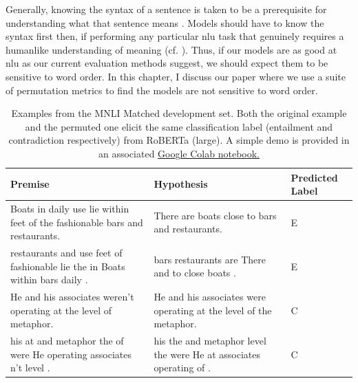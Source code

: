 \documentclass[letterpaper, 12pt]{report}
\begin{document}
Generally, knowing the syntax of a sentence is taken to be a prerequisite for understanding what that sentence means \citep{heim-kratzer-1998-semantics}.
Models should have to know the syntax first then, if performing any particular \acrshort{nlu} task that genuinely requires a humanlike understanding of meaning (cf. \citealt{bender-koller-2020-climbing}).
Thus, if our models are as good at \acrshort{nlu} as our current evaluation methods suggest, we should expect them to be sensitive to word order.
In this chapter, I discuss our paper \cite{sinha-etal-2021-unnatural} where we use a suite of permutation metrics to find the models are not sensitive to word order.

\begin{table}[t]
    \centering
    \small
    \begin{adjustbox}{max width=0.95\linewidth}
    \begin{tabular}{p{11em}p{9em}p{3em}} %
    \toprule
     \bf Premise & \bf Hypothesis & \bf Predicted Label \\ \midrule
    Boats in daily use lie within feet of the fashionable bars and restaurants.  & There are boats close to bars and restaurants. & E \\
    \addlinespace[0.5em]
    restaurants and use feet of fashionable lie the in Boats within bars daily . & bars restaurants are There and to close boats . & E \\ \midrule
    He and his associates weren't operating at the level of metaphor. & He and his associates were operating at the level of the metaphor. & C\\  \addlinespace[0.5em]
    his at and metaphor the of were He operating associates n't level . & his the and metaphor level the were He at associates operating of . & C\\
    \bottomrule
    \end{tabular}
   \end{adjustbox}
    \caption{Examples from the MNLI Matched development set. Both the original example and the permuted one elicit the same classification label (entailment and contradiction respectively) from RoBERTa (large).
    A simple demo is provided in an associated \href{https://colab.research.google.com/drive/1vv8Xmag1go3dib4vZXUZXAFB4ltDaMH7?usp=sharing}{Google Colab notebook.}}
    \label{tab:unli:example}
\end{table}
\end{document}
